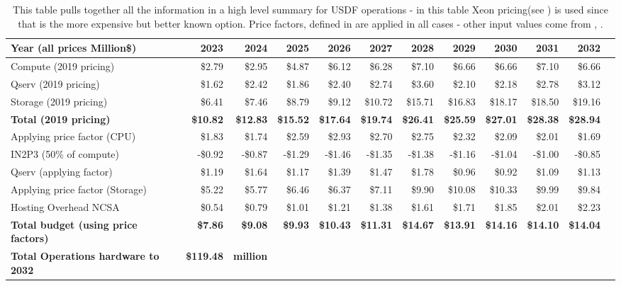\tiny \begin{longtable} { |p{}  |r  |r  |r  |r  |r  |r  |r  |r  |r  |r  |r |} 
\caption{This table pulls together all the information in a high level summary for USDF operations - in this table Xeon pricing(see ) is used since that is the more expensive but better known option. Price factors, defined in  are applied in all cases - other input values come from , .
 \label{tab:opsSumUSDF}}\\ 
\hline 
\textbf{Year  (all prices Million\$)}&\textbf{2023}&\textbf{2024}&\textbf{2025}&\textbf{2026}&\textbf{2027}&\textbf{2028}&\textbf{2029}&\textbf{2030}&\textbf{2031}&\textbf{2032} \\ \hline
{Compute (2019 pricing)}&{\$2.79}&{\$2.95}&{\$4.87}&{\$6.12}&{\$6.28}&{\$7.10}&{\$6.66}&{\$6.66}&{\$7.10}&{\$6.66} \\ \hline
{Qserv (2019 pricing)}&{\$1.62}&{\$2.42}&{\$1.86}&{\$2.40}&{\$2.74}&{\$3.60}&{\$2.10}&{\$2.18}&{\$2.78}&{\$3.12} \\ \hline
{Storage (2019 pricing)}&{\$6.41}&{\$7.46}&{\$8.79}&{\$9.12}&{\$10.72}&{\$15.71}&{\$16.83}&{\$18.17}&{\$18.50}&{\$19.16} \\ \hline
\textbf{Total (2019 pricing)}&\textbf{\$10.82}&\textbf{\$12.83}&\textbf{\$15.52}&\textbf{\$17.64}&\textbf{\$19.74}&\textbf{\$26.41}&\textbf{\$25.59}&\textbf{\$27.01}&\textbf{\$28.38}&\textbf{\$28.94} \\ \hline
{Applying price factor (CPU)}&{\$1.83}&{\$1.74}&{\$2.59}&{\$2.93}&{\$2.70}&{\$2.75}&{\$2.32}&{\$2.09}&{\$2.01}&{\$1.69} \\ \hline
{IN2P3 (50\% of compute)}&{-\$0.92}&{-\$0.87}&{-\$1.29}&{-\$1.46}&{-\$1.35}&{-\$1.38}&{-\$1.16}&{-\$1.04}&{-\$1.00}&{-\$0.85} \\ \hline
{Qserv (applying factor)}&{\$1.19}&{\$1.64}&{\$1.17}&{\$1.39}&{\$1.47}&{\$1.78}&{\$0.96}&{\$0.92}&{\$1.09}&{\$1.13} \\ \hline
{Applying price factor (Storage)}&{\$5.22}&{\$5.77}&{\$6.46}&{\$6.37}&{\$7.11}&{\$9.90}&{\$10.08}&{\$10.33}&{\$9.99}&{\$9.84} \\ \hline
{Hosting Overhead NCSA
}&{\$0.54}&{\$0.79}&{\$1.01}&{\$1.21}&{\$1.38}&{\$1.61}&{\$1.71}&{\$1.85}&{\$2.01}&{\$2.23} \\ \hline
\textbf{Total budget (using price factors)}&\textbf{\$7.86}&\textbf{\$9.08}&\textbf{\$9.93}&\textbf{\$10.43}&\textbf{\$11.31}&\textbf{\$14.67}&\textbf{\$13.91}&\textbf{\$14.16}&\textbf{\$14.10}&\textbf{\$14.04} \\ \hline
\textbf{Total Operations hardware to 2032 }&\textbf{\$119.48}&\textbf{million}&&&&&&&& \\ \hline
\end{longtable} \normalsize

